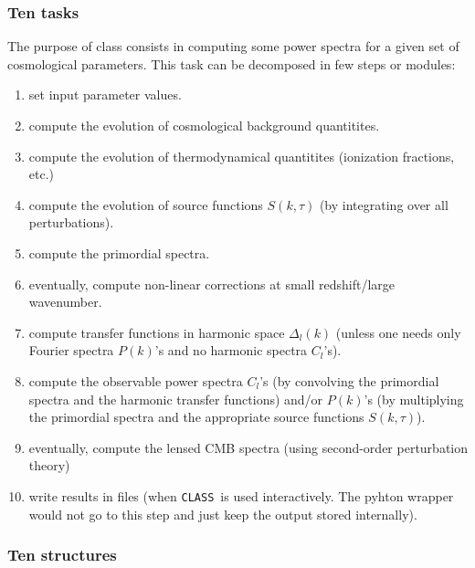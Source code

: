 \documentclass{article}
\newcommand\CLASS{{\tt CLASS}~}
\begin{document}
\subsubsection{Ten tasks}

The purpose of {\sc class} consists in computing some power spectra for a
given set of cosmological parameters. This task can be decomposed in few steps
or modules:
\begin{enumerate}
\item
set input parameter values.
\item
compute the evolution of cosmological background quantitites.
\item
compute the evolution of thermodynamical quantitites (ionization fractions, etc.)
\item
compute the evolution of source functions $S(k,\tau)$ (by integrating over all perturbations).
\item
compute the primordial spectra.
\item
eventually, compute non-linear corrections at small redshift/large wavenumber.
\item
compute transfer functions in harmonic space $\Delta_l(k)$ (unless one needs only Fourier spectra $P(k)$'s and no harmonic spectra $C_l$'s).
\item
compute the observable power spectra $C_l$'s (by convolving the primordial spectra and the harmonic transfer functions) and/or $P(k)$'s (by multiplying the primordial spectra and the appropriate source functions $S(k,\tau)$).
\item
eventually, compute the lensed CMB spectra (using second-order perturbation theory)
\item
write results in  files (when \CLASS is used interactively. The pyhton wrapper would not go to this step and just keep the output stored internally).
\end{enumerate}


\subsubsection{Ten structures}
\end{document}
